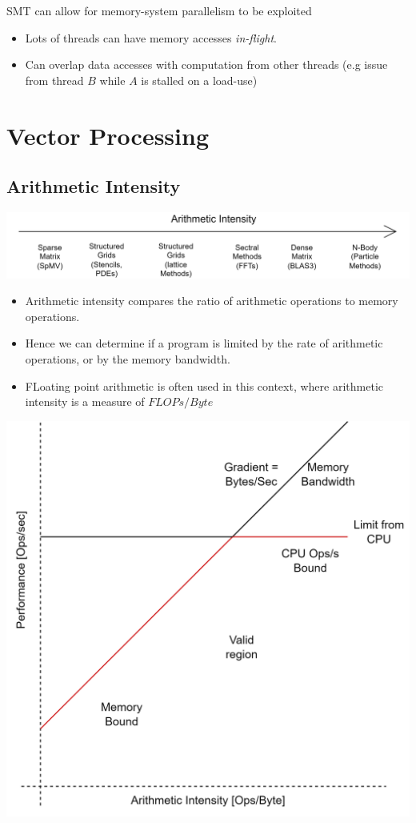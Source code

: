 SMT can allow for memory-system parallelism to be exploited
\begin{itemize}
	\item Lots of threads can have memory accesses \textit{in-flight}.
	\item Can overlap data accesses with computation from other threads (e.g issue from thread $B$ while $A$ is stalled on a load-use)
\end{itemize}

\unfinished

\section{Vector Processing}


\subsection{Arithmetic Intensity}
\begin{center}
	\includegraphics[width=\textwidth]{exploiting_parallelism/images/arithmetic_intensity.drawio.png}
\end{center}
\begin{itemize}
	\item Arithmetic intensity compares the ratio of arithmetic operations to memory operations.
	\item Hence we can determine if a program is limited by the rate of arithmetic operations, or by the memory bandwidth.
	\item FLoating point arithmetic is often used in this context, where arithmetic intensity is a measure of $FLOPs/Byte$
\end{itemize}
\begin{center}
	\includegraphics[width=.6\textwidth]{exploiting_parallelism/images/roofline_model.drawio.png}
\end{center}

